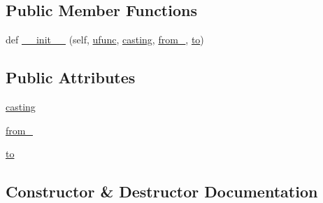 \subsection*{Public Member Functions}
\begin{DoxyCompactItemize}
\item 
def \hyperlink{classnumpy_1_1core_1_1__exceptions_1_1__UFuncCastingError_a6af9915ef4d880db3b84369751d78335}{\+\_\+\+\_\+init\+\_\+\+\_\+} (self, \hyperlink{classnumpy_1_1core_1_1__exceptions_1_1UFuncTypeError_a10866e4bfc9971e5aa77e8cd1c9e04f4}{ufunc}, \hyperlink{classnumpy_1_1core_1_1__exceptions_1_1__UFuncCastingError_aa7f02b5f0d75e682745e4209562dd04b}{casting}, \hyperlink{classnumpy_1_1core_1_1__exceptions_1_1__UFuncCastingError_a22df479bb7b9fed1dbd3d8701220edae}{from\+\_\+}, \hyperlink{classnumpy_1_1core_1_1__exceptions_1_1__UFuncCastingError_ab32680c508e0a39838f7996773627e68}{to})
\end{DoxyCompactItemize}
\subsection*{Public Attributes}
\begin{DoxyCompactItemize}
\item 
\hyperlink{classnumpy_1_1core_1_1__exceptions_1_1__UFuncCastingError_aa7f02b5f0d75e682745e4209562dd04b}{casting}
\item 
\hyperlink{classnumpy_1_1core_1_1__exceptions_1_1__UFuncCastingError_a22df479bb7b9fed1dbd3d8701220edae}{from\+\_\+}
\item 
\hyperlink{classnumpy_1_1core_1_1__exceptions_1_1__UFuncCastingError_ab32680c508e0a39838f7996773627e68}{to}
\end{DoxyCompactItemize}


\subsection{Constructor \& Destructor Documentation}
\mbox{\label{classnumpy_1_1core_1_1__exceptions_1_1__UFuncCastingError_a6af9915ef4d880db3b84369751d78335}} 
